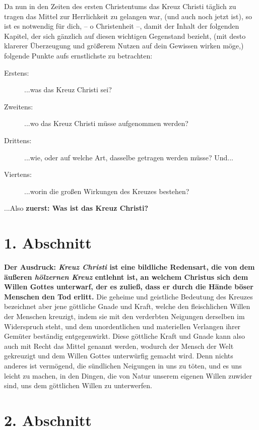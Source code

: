 \newpage

Da nun in den Zeiten des ersten Christentums das Kreuz Christi täglich zu
tragen das Mittel zur Herrlichkeit zu gelangen war, (und auch noch jetzt ist),
so ist es notwendig für dich, -- o Christenheit --, damit der Inhalt der
folgenden
Kapitel, der sich gänzlich auf diesen wichtigen Gegenstand bezieht, (mit desto
klarerer Überzeugung und größerem Nutzen auf dein Gewissen wirken möge,)
folgende Punkte aufs ernstlichste zu betrachten:
\begin{description}
\item[Erstens:] ...was das Kreuz Christi sei?
\item[Zweitens:] ...wo das Kreuz Christi müsse aufgenommen werden?
\item[Drittens:] ...wie, oder auf welche Art, dasselbe getragen werden müsse?
Und...
\item[Viertens:] ...worin die großen Wirkungen des Kreuzes bestehen?
\end{description}

...Also \textbf{zuerst: Was ist das Kreuz Christi?}


\section{1. Abschnitt} \label{kap3_ab1}

\label{ref:03_01_das_kreuz}
\textbf{Der Ausdruck: \textit{Kreuz Christi} ist eine
bildliche Redensart,
die von dem äußeren
\textit{hölzernen Kreuz} entlehnt ist, an welchem
 Christus sich dem Willen Gottes
unterwarf, der es zuließ, dass er durch die Hände böser Menschen den Tod
erlitt.}
Die geheime und geistliche Bedeutung des Kreuzes bezeichnet aber jene göttliche
Gnade und Kraft, welche den fleischlichen Willen der Menschen kreuzigt, indem
sie mit den verderbten Neigungen derselben im Widerspruch steht, und dem
unordentlichen und materiellen Verlangen ihrer Gemüter beständig
entgegenwirkt. Diese göttliche Kraft und Gnade kann also auch mit Recht das
Mittel genannt werden, wodurch der Mensch der Welt gekreuzigt und dem Willen
Gottes unterwürfig gemacht wird. Denn nichts anderes ist vermögend, die
sündlichen Neigungen in uns zu töten, und es uns leicht zu machen, in den
Dingen, die von Natur unserem eigenen Willen zuwider sind, uns dem göttlichen
Willen zu unterwerfen.

\section{2. Abschnitt} \label{kap3_ab2}

